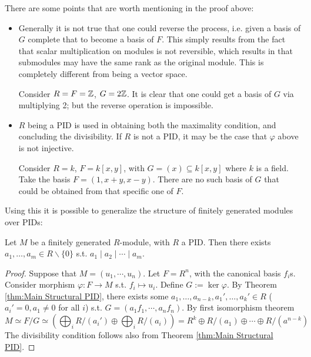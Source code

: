 \documentclass{article}
\begin{document}
\begin{remark}
    There are some points that are worth mentioning in the proof above:
    \begin{itemize}
        \item Generally it is not true that one could reverse the process, i.e. given a basis of $G$ complete that to become a basis of $F$. This simply results from the fact that scalar multiplication on modules is not reversible, which results in that submodules may have the same rank as the original module. This is completely different from being a vector space.
        
        Consider $R = F = \mathbb{Z}$, $G = 2\mathbb{Z}$. It is clear that one could get a basis of $G$ via multiplying 2; but the reverse operation is impossible.
        \item $R$ being a PID is used in obtaining both the maximality condition, and concluding the divisibility. If $R$ is not a PID, it may be the case that $\varphi$ above is not injective. 
        
        Consider $R = k$, $F = k[x, y]$, with $G = (x) \subseteq k[x, y]$ where $k$ is a field. Take the basis $F = (1, x + y, x - y)$. There are no such basis of $G$ that could be obtained from that specific one of $F$.
    \end{itemize}
\end{remark}

Using this it is possible to generalize the structure of finitely generated modules over PIDs:

\begin{theorem}[Sturcture, v1]\label{thm:Structure f.g. modules over PID v1}
    Let $M$ be a finitely generated $R$-module, with $R$ a PID. Then there exists $a_1, \ldots, a_m \in R\smallsetminus\{0\}$ s.t. $a_1 \mid a_2 \mid \cdots \mid a_m$. 
\end{theorem}

\begin{proof}
    Suppose that $M = (u_1, \cdots, u_n)$. Let $F = R^n$, with the canonical basis $f_i$s. Consider morphism $\varphi: F \to M$ s.t. $f_i \mapsto u_i$. Define $G := \ker \varphi$. By Theorem \ref{thm:Main Structural PID}, there exists some $a_1, \ldots, a_{n-k}, a_1', \ldots, a_k' \in R$ ($a_i' = 0, a_1 \neq 0$ for all $i$) s.t. $G = (a_1f_1, \cdots, a_n f_n)$. By first isomorphism theorem 
    \[
        M \simeq F / G \simeq \left(\bigoplus_i R/(a_i') \oplus \bigoplus_i R/(a_i)\right) = R^k \oplus R/(a_1) \oplus \cdots \oplus R/(a^{n-k})
    \]
    The divisibility condition follows also from Theorem \ref{thm:Main Structural PID}.
\end{proof}
\end{document}
